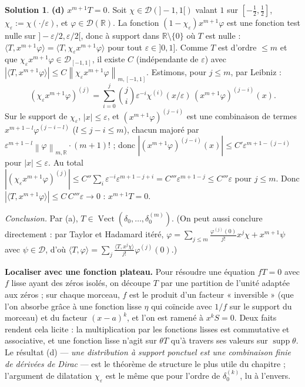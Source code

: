 \documentclass[11pt,a4paper]{article}
\newcommand{\R}{\mathbb{R}}
\newcommand{\Vect}{\operatorname{Vect}}
\newcommand{\norm}[1]{\left\|#1\right\|}
\DeclareMathOperator{\supp}{supp}
\newcommand{\D}{\mathcal{D}}
\theoremstyle{definition}
\newtheorem*{solution}{Solution}
\begin{document}
\begin{solution}
\medskip
\noindent\textbf{(d)} \emph{$x^{m+1}T=0$.} Soit $\chi\in\D(]-1,1[)$ valant $1$ sur $[-\frac12,\frac12]$, $\chi_\varepsilon:=\chi(\cdot/\varepsilon)$, et $\varphi\in\D(\R)$. La fonction $(1-\chi_\varepsilon)x^{m+1}\varphi$ est une fonction test nulle sur $]-\varepsilon/2,\varepsilon/2[$, donc à support dans $\R\setminus\{0\}$ où $T$ est nulle : $\langle T,x^{m+1}\varphi\rangle=\langle T,\chi_\varepsilon x^{m+1}\varphi\rangle$ pour tout $\varepsilon\in]0,1]$. Comme $T$ est d'ordre $\le m$ et que $\chi_\varepsilon x^{m+1}\varphi\in\D_{[-1,1]}$, il existe $C$ (indépendante de $\varepsilon$) avec $|\langle T,x^{m+1}\varphi\rangle|\le C\norm{\chi_\varepsilon x^{m+1}\varphi}_{m,[-1,1]}$. Estimons, pour $j\le m$, par Leibniz :
\[
(\chi_\varepsilon x^{m+1}\varphi)^{(j)}=\sum_{i=0}^j\binom ji\varepsilon^{-i}\chi^{(i)}(x/\varepsilon)\,(x^{m+1}\varphi)^{(j-i)}(x).
\]
Sur le support de $\chi_\varepsilon$, $|x|\le\varepsilon$, et $(x^{m+1}\varphi)^{(j-i)}$ est une combinaison de termes $x^{m+1-l}\varphi^{(j-i-l)}$ ($l\le j-i\le m$), chacun majoré par $\varepsilon^{m+1-l}\norm\varphi_{m,\R}\cdot(m+1)!$ ; donc $|(x^{m+1}\varphi)^{(j-i)}(x)|\le C'\varepsilon^{m+1-(j-i)}$ pour $|x|\le\varepsilon$. Au total $|(\chi_\varepsilon x^{m+1}\varphi)^{(j)}|\le C''\sum_i\varepsilon^{-i}\varepsilon^{m+1-j+i}=C'''\varepsilon^{m+1-j}\le C'''\varepsilon$ pour $j\le m$. Donc $|\langle T,x^{m+1}\varphi\rangle|\le C\,C'''\varepsilon\to0$ : $x^{m+1}T=0$.

\emph{Conclusion.} Par (a), $T\in\Vect(\delta_0,\dots,\delta_0^{(m)})$. (On peut aussi conclure directement : par Taylor et Hadamard itéré, $\varphi=\sum_{j\le m}\frac{\varphi^{(j)}(0)}{j!}x^j\chi+x^{m+1}\psi$ avec $\psi\in\D$, d'où $\langle T,\varphi\rangle=\sum_j\frac{\langle T,x^j\chi\rangle}{j!}\varphi^{(j)}(0)$.)
\end{solution}

\begin{pointcle}
\textbf{Localiser avec une fonction plateau.} Pour résoudre une équation $fT=0$ avec $f$ lisse ayant des zéros isolés, on découpe $T$ par une partition de l'unité adaptée aux zéros ; sur chaque morceau, $f$ est le produit d'un facteur « inversible » (que l'on absorbe grâce à une fonction lisse $\eta$ qui coïncide avec $1/f$ sur le support du morceau) et du facteur $(x-a)^k$, et l'on est ramené à $x^kS=0$. Deux faits rendent cela licite : la multiplication par les fonctions lisses est commutative et associative, et une fonction lisse n'agit sur $\theta T$ qu'à travers ses valeurs sur $\supp\theta$. Le résultat (d) — \emph{une distribution à support ponctuel est une combinaison finie de dérivées de Dirac} — est le théorème de structure le plus utile du chapitre ; l'argument de dilatation $\chi_\varepsilon$ est le même que pour l'ordre de $\delta_0^{(k)}$, lu à l'envers.
\end{pointcle}
\end{document}
